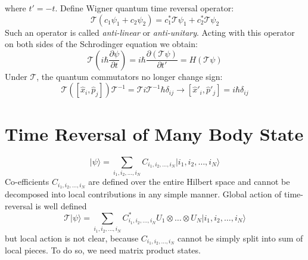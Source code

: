 \documentclass[a0,portrait]{a0poster}
\newcommand{\mc}[1]{\mathcal{#1}}
\newcommand{\ket}[1]{\vert #1 \rangle}
\begin{document}
\begin{multicols}{3}
where $ t' = -t $. Define Wigner quantum time reversal operator:
\begin{equation}\label{eqn:wigner-time-reversal}
	\mc{T} ( c_1 \psi_1 + c_2 \psi_2 ) = c_1^* \mc{T} \psi_1 + c_2^* \mc{T} \psi_2
\end{equation}
Such an operator is called \emph{anti-linear} or \emph{anti-unitary}. Acting with this operator on both sides of the Schrodinger equation we obtain:
\begin{equation}\label{eqn:trs-schrodinger-2}
	\mc{T} \left( i \hbar \frac{\partial \psi}{\partial t} \right) = i \hbar \frac{\partial (\mc{T} \psi)}{\partial t'} = H (\mc{T} \psi)
\end{equation}
Under $ \mc{T} $, the quantum commutators no longer change sign:
\begin{equation}\label{eqn:quantum-poisson-2}
	\mc{T} \left(\left[ \hat{x}_i, \hat{p}_j \right]\right) \mc{T}^{-1} = \mc{T} i \mc{T}^{-1} \hbar \delta_{ij} \rightarrow \left[\hat{x}'_i, \hat{p}'_j \right]= i \hbar \delta_{ij}
\end{equation}


\vspace*{-1cm}



\color{DarkGreen}


\section*{Time Reversal of Many Body State}

\begin{equation}\label{eqn:many-body-state}
	\ket{\psi} = \sum_{i_1, i_2, \ldots, i_N} C_{i_1, i_2, \ldots, i_N} \ket{i_1, i_2, \ldots, i_N}
\end{equation}
Co-efficients $  C_{i_1, i_2, \ldots, i_N} $ are defined over the entire Hilbert space and cannot be decomposed into local contributions in any simple manner. Global action of time-reversal is well defined
\begin{equation}\label{eqn:trs-many-body-state}
	\mc{T} \ket{\psi} = \sum_{i_1, i_2, \ldots, i_N} C^*_{i_1, i_2, \ldots, i_N} U_1 \otimes \ldots \otimes U_N \ket{i_1, i_2, \ldots, i_N}
\end{equation}
but local action is not clear, because $ C_{i_1, i_2, \ldots, i_N} $ cannot be simply split into sum of local pieces. To do so, we need matrix product states.


\end{multicols}
\end{document}
